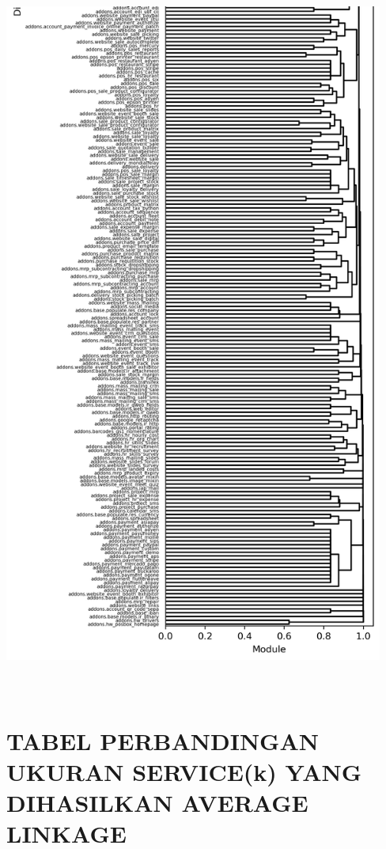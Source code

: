 \begin{center}
  \includegraphics[width=12.5cm]{img/lampiran/average-full-2.png}
  \label{fig:average-full-2}
\end{center}

\chapter{\\ TABEL PERBANDINGAN UKURAN SERVICE(k) YANG DIHASILKAN AVERAGE LINKAGE}

